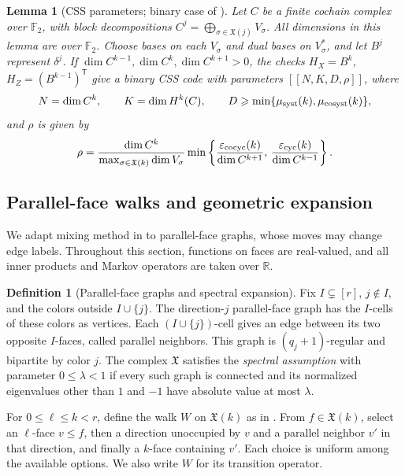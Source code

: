 \documentclass[11pt,letterpaper]{article}
\renewcommand{\le}{\leqslant}
\renewcommand{\ge}{\geqslant}
\newtheorem{lemma}[theorem]{Lemma}
\theoremstyle{definition}
\newtheorem{definition}[theorem]{Definition}
\theoremstyle{remark}
\newcommand{\F}{\mathbb F}
\newcommand{\X}{\mathfrak{X}}
\newcommand{\eps}{\varepsilon}
\begin{document}
\begin{lemma}[CSS parameters;
binary case of {\cite[Lemma~2.7]{DinurLinVidick2024}}]
\label{lem:css-parameters}
Let $C$ be a finite cochain complex over $\F_2$, with block
decompositions $C^j=\bigoplus_{\sigma\in\X(j)}V_\sigma$.
All dimensions in this lemma are over $\F_2$.
Choose bases on each $V_\sigma$ and dual bases on $V_\sigma^*$,
and let $B^j$ represent $\delta^j$.
If $\dim C^{k-1},\dim C^k,\dim C^{k+1}>0$, the checks $H_X=B^k$,
$H_Z=(B^{k-1})^{\mathsf T}$ give a binary CSS code with parameters
$[[N,K,D,\rho]]$, where
\[
 N=\dim C^k,\qquad K=\dim H^k(C),\qquad
 D\ge\min\{\mu_{\rm syst}(k),\mu_{\rm cosyst}(k)\},
\]
and $\rho$ is given by
\begin{equation}
 \rho=\frac{\dim C^k}{\max_{\sigma\in\X(k)}\dim V_\sigma}
 \min\left\{
 \frac{\eps_{\rm cocyc}(k)}{\dim C^{k+1}},\,
 \frac{\eps_{\rm cyc}(k)}{\dim C^{k-1}}\right\}.
 \label{eq:css-parameter-soundness}
\end{equation}
\end{lemma}

\subsection{Parallel-face walks and geometric expansion}
\label{sec:geometric-expansion}
We adapt mixing method in \cite[Section~6]{DinurLinVidick2024}
to parallel-face graphs, whose moves may change edge labels. Throughout this section, functions on faces are
real-valued, and all inner products and Markov operators
are taken over $\mathbb R$.

\begin{definition}[Parallel-face graphs and spectral expansion]
\label{def:parallel-face-graphs}\label{def:directional-expansion}
Fix $I\subsetneq[r]$, $j\notin I$, and the colors outside
$I\cup\{j\}$. The direction-$j$ parallel-face graph has the
$I$-cells of these colors as vertices. Each $(I\cup\{j\})$-cell
gives an edge between its two opposite $I$-faces, called parallel
neighbors. This graph is $(q_j+1)$-regular and bipartite by color $j$.
The complex $\X$ satisfies the \emph{spectral assumption} with
parameter $0\le\lambda<1$ if every such graph is connected and
its normalized eigenvalues other than $1$ and $-1$ have absolute
value at most $\lambda$.
\end{definition}

For $0\le\ell\le k<r$, define the walk $W$ on $\X(k)$ as in
\cite[Definition~6.6]{DinurLinVidick2024}. From $f\in \X(k)$, select an $\ell$-face
$v\le f$, then a direction unoccupied by $v$ and a parallel
neighbor $v'$ in that direction, and finally a $k$-face containing
$v'$. Each choice is uniform among the available options.
We also write $W$ for its transition operator.
\end{document}
